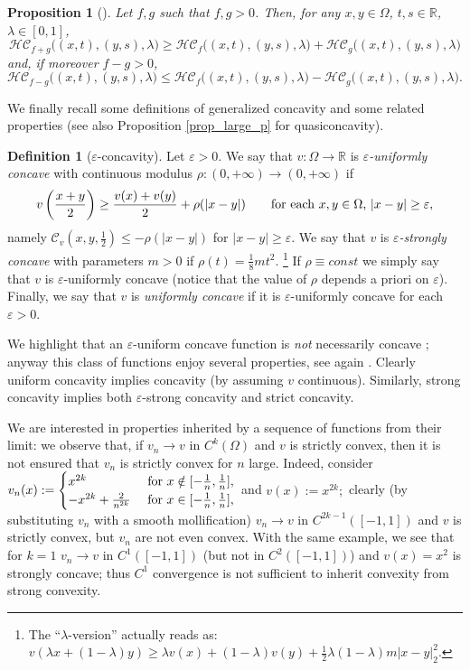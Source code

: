 \documentclass[11pt, reqno]{amsart}
\newtheorem{proposition}[lemma]{Proposition}
\theoremstyle{definition}
\newtheorem{definition}[lemma]{Definition}
\numberwithin{equation}{section}
\newcommand{\R}{\mathbb{R}}
\newcommand{\mc}[1]{\mathcal{#1}}
\def\eps{\varepsilon}
\begin{document}
\begin{proposition}[\cite{BuSq20}]
\label{prop_diff_harm_concav}
Let $f,g$ such that $f,g>0$. Then, for any $x,y \in \Omega$, $t, s \in \R$, $\lambda \in [0,1]$,
$$\mc{HC}_{f+g}\big((x,t),(y,s),\lambda\big) \geq \mc{HC}_f\big((x,t),(y,s),\lambda\big) + \mc{HC}_g\big((x,t),(y,s),\lambda\big)$$
and, if moreover $f-g>0$,
$$\mc{HC}_{f-g}\big((x,t),(y,s),\lambda\big) \leq \mc{HC}_f\big((x,t),(y,s),\lambda\big) - \mc{HC}_g\big((x,t),(y,s),\lambda\big).$$
\end{proposition}

\smallskip

We finally recall some definitions of generalized concavity and some related properties (see also Proposition \ref{prop_large_p} for quasiconcavity). 
\begin{definition}[$\eps$-concavity]
\label{def_unif_strong_concav}
Let $\eps>0$. We say that $v: \Omega \to \R$ is \emph{$\eps$-uniformly concave} with continuous modulus $\rho: (0,+\infty) \to (0,+\infty)$ if 
$$v\left(\frac{x+y}{2}\right)\geq \frac{v(x)+v(y)}{2} + \rho(|x-y|) \qquad \hbox{for each 
$x,y \in \Omega$, $|x-y|\geq \eps$},$$
namely $\mc{C}_v(x,y,\frac{1}{2}) \leq - \rho(|x-y|)$ for $|x-y|\geq \eps$. We say that $v$ is \emph{$\eps$-strongly concave} with parameters $m>0$ if $\rho(t) = \frac{1}{8} m t^2$.%
\footnote{The ``$\lambda$-version'' actually reads as: $v(\lambda x + (1-\lambda) y) \geq \lambda v(x) + (1-\lambda) v(y) + \frac{1}{2} \lambda(1-\lambda) m |x-y|_2^2$.
}
If $\rho \equiv const$ we simply say that $v$ is $\eps$-uniformly concave (notice that the value of $\rho$ depends a priori on $\eps$). Finally, we say that $v$ is \emph{uniformly concave} if it is $\eps$-uniformly concave for each $\eps>0$.
\end{definition}
We highlight that an $\eps$-uniform concave function is \emph{not} necessarily concave \cite[Example 2.5]{GrRa22}; anyway this class of functions enjoy several properties, see again \cite{GrRa22}. 
Clearly uniform concavity implies concavity (by assuming $v$ continuous).
Similarly, strong concavity implies both $\eps$-strong concavity and strict concavity. 


We are interested in properties inherited by a sequence of functions from their limit: we observe that, if $v_n \to v$ in $C^k(\Omega)$ and $v$ is strictly convex, then it is not ensured that $v_n$ is strictly convex for $n$ large. Indeed, consider 
$v_n(x):=\begin{cases} x^{2k} & \hbox{ for $x \notin [-\frac{1}{n}, \frac{1}{n}]$}, \\ -x^{2k} + \frac{2}{n^{2k}} & \hbox{ for $x \in [-\frac{1}{n},\frac{1}{n}]$}, \end{cases}$ and $v(x):=x^{2k};$
clearly (by substituting $v_n$ with a smooth mollification) $v_n \to v$ in $C^{2k-1}([-1,1])$ and $v$ is strictly convex, but $v_n$ are not even convex. 
With the same example, we see that for $k=1$ $v_n \to v$ in $C^1([-1,1])$ (but not in $C^2([-1,1])$) and $v(x)=x^2$ is strongly concave; thus $C^1$ convergence is not sufficient to inherit convexity from strong convexity.
\end{document}
